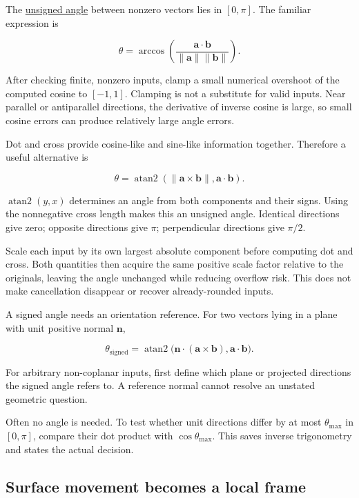 \hypertarget{01-foundations-i-ch017-an-angle-is-a-question-with-a-domain}{}

The \hyperref[01-foundations-i-ch017-an-angle-is-a-question-with-a-domain]{unsigned angle} between nonzero vectors lies in \([0,\pi]\). The familiar expression is

\[
\theta=\arccos\left(
\frac{\mathbf a\cdot\mathbf b}{\|\mathbf a\|\|\mathbf b\|}
\right).
\]

After checking finite, nonzero inputs, clamp a small numerical overshoot of the computed cosine to \([-1,1]\). Clamping is not a substitute for valid inputs. Near parallel or antiparallel directions, the derivative of inverse cosine is large, so small cosine errors can produce relatively large angle errors.

Dot and cross provide cosine-like and sine-like information together. Therefore a useful alternative is

\[
\theta=\operatorname{atan2}
\left(\|\mathbf a\times\mathbf b\|,\mathbf a\cdot\mathbf b\right).
\]

\(\operatorname{atan2}(y,x)\) determines an angle from both components and their signs. Using the nonnegative cross length makes this an unsigned angle. Identical directions give zero; opposite directions give \(\pi\); perpendicular directions give \(\pi/2\).

Scale each input by its own largest absolute component before computing dot and cross. Both quantities then acquire the same positive scale factor relative to the originals, leaving the angle unchanged while reducing overflow risk. This does not make cancellation disappear or recover already-rounded inputs.

A signed angle needs an orientation reference. For two vectors lying in a plane with unit positive normal \(\mathbf n\),

\[
\theta_{\mathrm{signed}}=
\operatorname{atan2}\big(\mathbf n\cdot(\mathbf a\times\mathbf b),
\mathbf a\cdot\mathbf b\big).
\]

For arbitrary non-coplanar inputs, first define which plane or projected directions the signed angle refers to. A reference normal cannot resolve an unstated geometric question.

Often no angle is needed. To test whether unit directions differ by at most \(\theta_{\max}\) in \([0,\pi]\), compare their dot product with \(\cos\theta_{\max}\). This saves inverse trigonometry and states the actual decision.

\subsection{Surface movement becomes a local frame}\label{01-foundations-i-ch017-surface-movement-becomes-a-local-frame}

